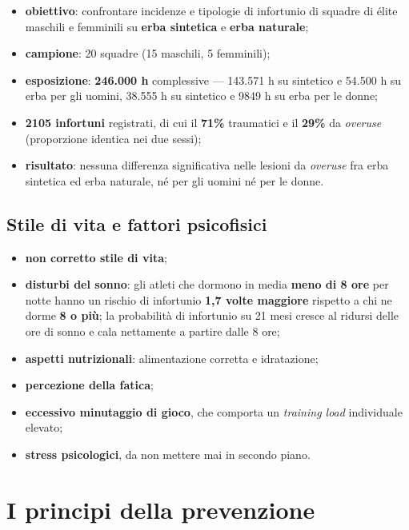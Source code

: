 \begin{itemize}
  \item \textbf{obiettivo}: confrontare incidenze e tipologie di infortunio di squadre di élite
    maschili e femminili su \textbf{erba sintetica} e \textbf{erba naturale};
  \item \textbf{campione}: 20 squadre (15 maschili, 5 femminili);
  \item \textbf{esposizione}: \textbf{246.000 h} complessive --- 143.571 h su sintetico e 54.500 h
    su erba per gli uomini, 38.555 h su sintetico e 9849 h su erba per le donne;
  \item \textbf{2105 infortuni} registrati, di cui il \textbf{71\%} traumatici e il \textbf{29\%} da
    \textit{overuse} (proporzione identica nei due sessi);
  \item \textbf{risultato}: nessuna differenza significativa nelle lesioni da \textit{overuse} fra
    erba sintetica ed erba naturale, né per gli uomini né per le donne.
\end{itemize}

\subsection{Stile di vita e fattori psicofisici}

\begin{itemize}
  \item \textbf{non corretto stile di vita};
  \item \textbf{disturbi del sonno}: gli atleti che dormono in media \textbf{meno di 8 ore} per
    notte hanno un rischio di infortunio \textbf{1,7 volte maggiore} rispetto a chi ne dorme
    \textbf{8 o più}; la probabilità di infortunio su 21 mesi cresce al ridursi delle ore di sonno e
    cala nettamente a partire dalle 8 ore;
  \item \textbf{aspetti nutrizionali}: alimentazione corretta e idratazione;
  \item \textbf{percezione della fatica};
  \item \textbf{eccessivo minutaggio di gioco}, che comporta un \textit{training load} individuale
    elevato;
  \item \textbf{stress psicologici}, da non mettere mai in secondo piano.
\end{itemize}

\section{I principi della prevenzione}

